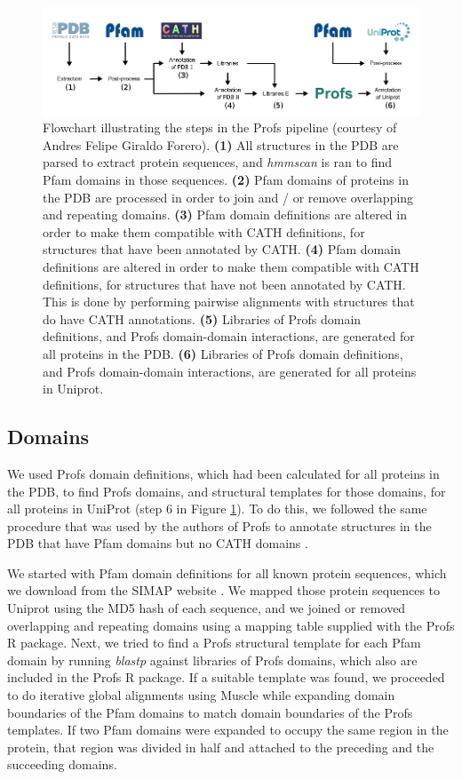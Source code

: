 \begin{figure}[t]
	\centering
	\includegraphics[width=1.0\linewidth]{static/profs/profs_pipeline.png}
	\caption[Profs pipeline.]{Flowchart illustrating the steps in the Profs pipeline (courtesy of Andres Felipe Giraldo Forero). \textbf{(1)} All structures in the PDB are parsed to extract protein sequences, and \textit{hmmscan} is ran to find Pfam domains in those sequences. \textbf{(2)} Pfam domains of proteins in the PDB are processed in order to join and / or remove overlapping and repeating domains. \textbf{(3)} Pfam domain definitions are altered in order to make them compatible with CATH definitions, for structures that have been annotated by CATH. \textbf{(4)} Pfam domain definitions are altered in order to make them compatible with CATH definitions, for structures that have not been annotated by CATH. This is done by performing pairwise alignments with structures that do have CATH annotations. \textbf{(5)} Libraries of Profs domain definitions, and Profs domain-domain interactions, are generated for all proteins in the PDB.  \textbf{(6)} Libraries of Profs domain definitions, and Profs domain-domain interactions, are generated for all proteins in Uniprot.}
	\label{fig:profs_pipeline}
\end{figure}


\subsection{Domains}

We used Profs domain definitions, which had been calculated for all proteins in the PDB, to find Profs domains, and structural templates for those domains, for all proteins in UniProt (step 6 in Figure \ref{fig:profs_pipeline}). To do this, we followed the same procedure that was used by the authors of Profs to annotate structures in the PDB that have Pfam domains but no CATH domains \cite{witvliet_elaspic_2016}.

We started with Pfam domain definitions for all known protein sequences, which we download from the SIMAP website \cite{rattei_simapcomprehensive_2010}. We mapped those protein sequences to Uniprot using the MD5 hash of each sequence, and we joined or removed overlapping and repeating domains using a mapping table supplied with the Profs R package. Next, we tried to find a Profs structural template for each Pfam domain by running \textit{blastp} against libraries of Profs domains, which also are included in the Profs R package. If a suitable template was found, we proceeded to do iterative global alignments using Muscle \cite{edgar_muscle:_2004} while expanding domain boundaries of the Pfam domains to match domain boundaries of the Profs templates. If two Pfam domains were expanded to occupy the same region in the protein, that region was divided in half and attached to the preceding and the succeeding domains.

